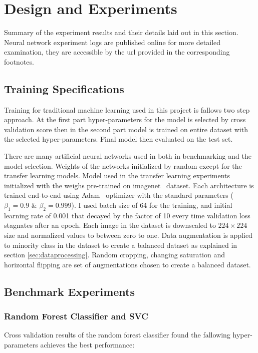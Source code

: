 \chapter{Design and Experiments}
Summary of the experiment results and their details laid out in this section.
Neural network experiment logs are published online for more detailed examination, they are accessible by the url provided in the corresponding footnotes.

\section{Training Specifications}
Training for traditional machine learning used in this project is fallows two step approach.
At the first part hyper-parameters for the model is selected by cross validation score then in the second part model is trained on entire dataset with the selected hyper-parameters.
Final model then evaluated on the test set.

There are many artificial neural networks used in both in benchmarking and the model selection.
Weights of the networks initialized by random except for the transfer learning models.
Model used in the transfer learning experiments initialized with the weighs pre-trained on imagenet~\cite{imagenet} dataset.
Each architecture is trained end-to-end using Adam~\cite{adam} optimizer with the standard parameters ($\beta_1 = 0.9$ \& $\beta_2 = 0.999$).
I used batch size of 64 for the training, and initial learning rate of 0.001 that decayed by the factor of 10 every time validation loss stagnates after an epoch.
Each image in the dataset is downscaled to $224 \times 224$ size and normalized values to between zero to one.
Data augmentation is applied to minority class in the dataset to create a balanced dataset as explained in section \ref{sec:dataprocessing}.
Random cropping, changing saturation and horizontal flipping are set of augmentations chosen to create a balanced dataset.


\section{Benchmark Experiments}

\subsection{Random Forest Classifier and SVC}
Cross validation results of the random forest classifier found the fallowing hyper-parameters achieves the best performance:

